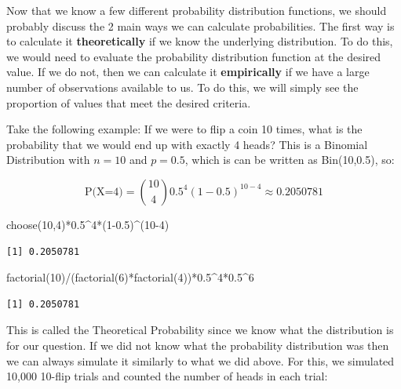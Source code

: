 \documentclass[
  letterpaper,
  DIV=11,
  numbers=noendperiod]{scrreprt}
\newenvironment{Shaded}{\begin{snugshade}}{\end{snugshade}}
\newcommand{\DecValTok}[1]{\textcolor[rgb]{0.68,0.00,0.00}{#1}}
\newcommand{\FloatTok}[1]{\textcolor[rgb]{0.68,0.00,0.00}{#1}}
\newcommand{\FunctionTok}[1]{\textcolor[rgb]{0.28,0.35,0.67}{#1}}
\newcommand{\NormalTok}[1]{\textcolor[rgb]{0.00,0.23,0.31}{#1}}
\newcommand{\SpecialCharTok}[1]{\textcolor[rgb]{0.37,0.37,0.37}{#1}}
\begin{document}
Now that we know a few different probability distribution functions, we
should probably discuss the 2 main ways we can calculate probabilities.
The first way is to calculate it \textbf{theoretically} if we know the
underlying distribution. To do this, we would need to evaluate the
probability distribution function at the desired value. If we do not,
then we can calculate it \textbf{empirically} if we have a large number
of observations available to us. To do this, we will simply see the
proportion of values that meet the desired criteria.

Take the following example: If we were to flip a coin 10 times, what is
the probability that we would end up with exactly 4 heads? This is a
Binomial Distribution with \(n=10\) and \(p=0.5\), which is can be
written as Bin(10,0.5), so:

\[ \text{P(X=4)}={10\choose 4}0.5^4(1-0.5)^{10-4}\approx 0.2050781 \]

\begin{Shaded}
\begin{Highlighting}[]
\FunctionTok{choose}\NormalTok{(}\DecValTok{10}\NormalTok{,}\DecValTok{4}\NormalTok{)}\SpecialCharTok{*}\FloatTok{0.5}\SpecialCharTok{\^{}}\DecValTok{4}\SpecialCharTok{*}\NormalTok{(}\DecValTok{1}\FloatTok{{-}0.5}\NormalTok{)}\SpecialCharTok{\^{}}\NormalTok{(}\DecValTok{10{-}4}\NormalTok{)}
\end{Highlighting}
\end{Shaded}

\begin{verbatim}
[1] 0.2050781
\end{verbatim}

\begin{Shaded}
\begin{Highlighting}[]
\FunctionTok{factorial}\NormalTok{(}\DecValTok{10}\NormalTok{)}\SpecialCharTok{/}\NormalTok{(}\FunctionTok{factorial}\NormalTok{(}\DecValTok{6}\NormalTok{)}\SpecialCharTok{*}\FunctionTok{factorial}\NormalTok{(}\DecValTok{4}\NormalTok{))}\SpecialCharTok{*}\FloatTok{0.5}\SpecialCharTok{\^{}}\DecValTok{4}\SpecialCharTok{*}\FloatTok{0.5}\SpecialCharTok{\^{}}\DecValTok{6}
\end{Highlighting}
\end{Shaded}

\begin{verbatim}
[1] 0.2050781
\end{verbatim}

This is called the Theoretical Probability since we know what the
distribution is for our question. If we did not know what the
probability distribution was then we can always simulate it similarly to
what we did above. For this, we simulated 10,000 10-flip trials and
counted the number of heads in each trial:
\end{document}
